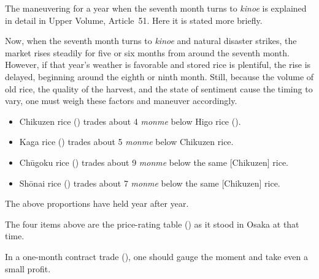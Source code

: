 \commentary
The maneuvering for a year when the seventh month turns to \textit{kinoe}
is explained in detail in Upper Volume, Article~51. Here it is
stated more briefly.

Now, when the seventh month turns to \textit{kinoe} and natural disaster
strikes, the market rises steadily for five or six months from around
the seventh month. However, if that year's weather is favorable and
stored rice is plentiful, the rise is delayed, beginning around the
eighth or ninth month. Still, because the volume of old rice, the
quality of the harvest, and the state of sentiment cause the timing
to vary, one must weigh these factors and maneuver accordingly.


\begin{sokyubox}
{\small\itshape\color{sokyubar} }

\medskip
\begin{itemize}[nosep]
\item Chikuzen rice () trades about 4 \textit{monme} below Higo rice ().
\item Kaga rice () trades about 5 \textit{monme} below Chikuzen rice.
\item Ch\=ugoku rice () trades about 9 \textit{monme} below the same [Chikuzen] rice.
\item Sh\=onai rice () trades about 7 \textit{monme} below the same [Chikuzen] rice.
\end{itemize}

\medskip
The above proportions have held year after year.
\end{sokyubox}

\commentary
The four items above are the price-rating table ()
as it stood in Osaka at that time.


\begin{sokyubox}
{\small\itshape\color{sokyubar} }

\medskip
In a one-month contract trade (), one should gauge
the moment and take even a small profit.
\end{sokyubox}

